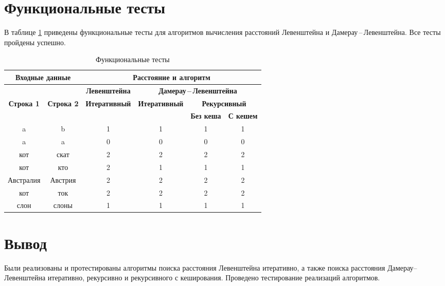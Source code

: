 \clearpage

\section{Функциональные тесты}

В таблице \ref{tbl:func_tests} приведены функциональные тесты для алгоритмов вычисления расстояний Левенштейна и Дамерау\,--\,Левенштейна. Все тесты пройдены успешно.

\begin{table}[ht]
	\small
	\begin{center}
		\begin{threeparttable}
		\caption{Функциональные тесты}
		\label{tbl:func_tests}
		\begin{tabular}{|c|c|c|c|c|c|}
			\hline
			\multicolumn{2}{|c|}{\bfseries Входные данные}
			& \multicolumn{4}{c|}{\bfseries Расстояние и алгоритм} \\ 
			\hline 
			&
			& \multicolumn{1}{c|}{\bfseries Левенштейна} 
			& \multicolumn{3}{c|}{\bfseries Дамерау\,--\,Левенштейна} \\ \cline{3-6}
			
			\bfseries Строка 1 & \bfseries Строка 2 & \bfseries Итеративный & \bfseries Итеративный
			
			& \multicolumn{2}{c|}{\bfseries Рекурсивный} \\ \cline{5-6}
			& & & & \bfseries Без кеша & \bfseries С кешем \\
			\hline
			a & b & 1 & 1 & 1 & 1 \\
			\hline
			a & a & 0 & 0 & 0 & 0 \\
			\hline
			кот & скат & 2 & 2 & 2 & 2 \\
			\hline
			кот & кто & 2 & 1 & 1 & 1 \\
			\hline
			Австралия & Австрия & 2 & 2 & 2 & 2 \\
			\hline
			кот & ток & 2 & 2 & 2 & 2 \\
			\hline
			слон & слоны & 1 & 1 & 1 & 1 \\
			\hline
		\end{tabular}	
		\end{threeparttable}
	\end{center}
\end{table}

\section*{Вывод}
Были реализованы и протестированы алгоритмы поиска расстояния Левенштейна итеративно, а также поиска расстояния Дамерау–Левенштейна итеративно, рекурсивно и рекурсивного с кеширования. Проведено тестирование реализаций алгоритмов.
